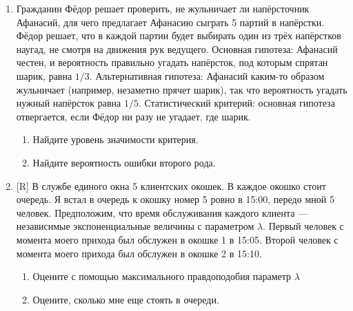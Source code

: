 \begin{enumerate}
\item Гражданин Фёдор решает проверить, не жульничает ли напёрсточник Афанасий,
для чего предлагает Афанасию сыграть 5 партий в напёрстки. Фёдор решает, что в
каждой партии будет выбирать один из трёх напёрстков наугад, не смотря на движения
рук ведущего. Основная гипотеза: Афанасий честен, и вероятность правильно угадать
напёрсток, под которым спрятан шарик, равна $1/3$. Альтернативная гипотеза: Афанасий
каким-то образом жульничает (например, незаметно прячет шарик), так что вероятность
угадать нужный напёрсток равна $1/5$. Статистический критерий: основная гипотеза
отвергается, если Фёдор ни разу не угадает, где шарик.
\begin{enumerate}
\item Найдите уровень значимости критерия.
\item Найдите вероятность ошибки второго рода.
\end{enumerate}

\item $[$R] В службе единого окна 5 клиентских окошек. В каждое окошко стоит очередь.
Я встал в очередь к окошку номер 5 ровно в 15:00, передо мной 5 человек. Предположим,
что время обслуживания каждого клиента — независимые экспоненциальные величины с
параметром $\lambda$. Первый человек с момента моего прихода был обслужен в окошке
1 в 15:05. Второй человек с момента моего прихода был обслужен в окошке 2 в 15:10.
\begin{enumerate}
\item Оцените с помощью максимального правдоподобия параметр $\lambda$
\item Оцените, сколько мне еще стоять в очереди.
\end{enumerate}
\end{enumerate}
